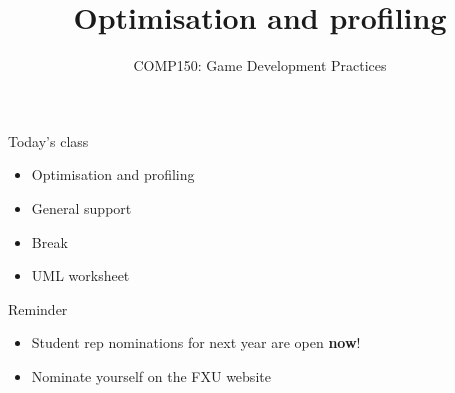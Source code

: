 \usepackage{../../beamerthemeFalmouthGamesAcademy}
\usepackage{multimedia}
\graphicspath{ {../../} }


\usepackage[normalem]{ulem}
\usepackage{wasysym}

\usepackage{pdfpages}

\usetikzlibrary{arrows,automata}


\title{Optimisation and profiling}
\subtitle{COMP150: Game Development Practices}

\frame{\titlepage} 

\begin{frame}{Today's class}
    \begin{itemize}
        \item Optimisation and profiling
        \item General support
        \item Break
        \item UML worksheet
    \end{itemize}
\end{frame}

\begin{frame}{Reminder}
    \begin{itemize}
    	\item Student rep nominations for next year are open \textbf{now}!
        \item Nominate yourself on the FXU website
    \end{itemize}
\end{frame}






